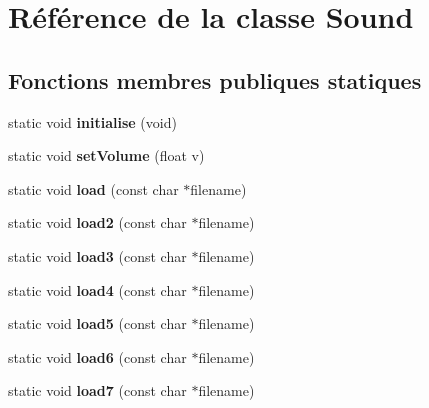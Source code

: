 \hypertarget{class_sound}{\section{Référence de la classe Sound}
\label{class_sound}
}
\subsection*{Fonctions membres publiques statiques}
\begin{DoxyCompactItemize}
\item 
\hypertarget{class_sound_a74aaf81f4576223eb5ac1d717ab42239}{static void {\bfseries initialise} (void)}\label{class_sound_a74aaf81f4576223eb5ac1d717ab42239}

\item 
\hypertarget{class_sound_a17c6f860b8fb6d0c56dfacdc21b70167}{static void {\bfseries set\-Volume} (float v)}\label{class_sound_a17c6f860b8fb6d0c56dfacdc21b70167}

\item 
\hypertarget{class_sound_a487be6a69cda8e0f182088b0ba7f9ba3}{static void {\bfseries load} (const char $\ast$filename)}\label{class_sound_a487be6a69cda8e0f182088b0ba7f9ba3}

\item 
\hypertarget{class_sound_a46173adc45b339f27fd27cccc7c3238d}{static void {\bfseries load2} (const char $\ast$filename)}\label{class_sound_a46173adc45b339f27fd27cccc7c3238d}

\item 
\hypertarget{class_sound_a78ed67e8069b9eb1b3ef54c33fb22f9e}{static void {\bfseries load3} (const char $\ast$filename)}\label{class_sound_a78ed67e8069b9eb1b3ef54c33fb22f9e}

\item 
\hypertarget{class_sound_a7bcd61ba405267e2e914b1c2754b3388}{static void {\bfseries load4} (const char $\ast$filename)}\label{class_sound_a7bcd61ba405267e2e914b1c2754b3388}

\item 
\hypertarget{class_sound_a4c372baf44b269d7ad7ee7b815725ce4}{static void {\bfseries load5} (const char $\ast$filename)}\label{class_sound_a4c372baf44b269d7ad7ee7b815725ce4}

\item 
\hypertarget{class_sound_a920383cdcfb5d9c679c81d39d33219af}{static void {\bfseries load6} (const char $\ast$filename)}\label{class_sound_a920383cdcfb5d9c679c81d39d33219af}

\item 
\hypertarget{class_sound_aa2776ee19d1ce133815035640b0088a3}{static void {\bfseries load7} (const char $\ast$filename)}\label{class_sound_aa2776ee19d1ce133815035640b0088a3}


\end{DoxyCompactItemize}
